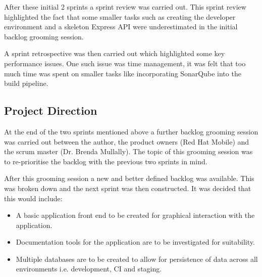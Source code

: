 After these initial 2 sprints a sprint review was carried out. This sprint review highlighted the fact that some smaller tasks such as creating the developer environment and a skeleton Express API were underestimated in the initial backlog grooming session.

A sprint retrospective was then carried out which highlighted some key performance issues. One such issue was time management, it was felt that too much time was spent on smaller tasks like incorporating SonarQube into the build pipeline.

\subsection{Project Direction}
At the end of the two sprints mentioned above a further backlog grooming session was carried out between the author, the product owners (Red Hat Mobile) and the scrum master (Dr. Brenda Mullally). The topic of this grooming session was to re-prioritise the backlog with the previous two sprints in mind.

After this grooming session a new and better defined backlog was available. This was broken down and the next sprint was then constructed. It was decided that this would include:

\begin{itemize}
	\item A basic application front end to be created for graphical interaction with the application.
	\item Documentation tools for the application are to be investigated for suitability.
	\item Multiple databases are to be created to allow for persistence of data across all environments i.e. development, CI and staging.
\end{itemize}
